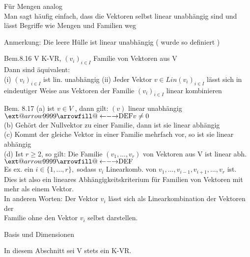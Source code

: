 \documentclass[headsepline,12pt,a4paper]{scrartcl}
\makeatletter
\newcommand\xleftrightarrow[2][]{%
  \ext@arrow 9999{\longleftrightarrowfill@}{#1}{#2}}
\newcommand\longleftrightarrowfill@{%
  \arrowfill@\leftarrow\relbar\rightarrow}
\makeatother
\begin{document}
Für Mengen analog \\

Man sagt häufig einfach, dass die Vektoren selbst linear unabhängig sind und lässt Begriffe wie Mengen und Familien weg \\

\item Anmerkung: Die leere Hülle ist linear unabhängig ( wurde so definiert ) \\

\newpage

\item[Bem.8.16] 
V K-VR, $(v_i)_{i \in I}$ Familie von Vektoren aus V \\
Dann sind äquivalent: \\

(i) $(v_i)_{i \in I}$ ist lin. unabhängig 
(ii) Jeder Vektor $ v \in \textit{Lin}(v_i)_{i \in I}$ lässt sich in eindeutiger Weise aus Vektoren der Familie $(v_i)_{i \in I}$ linear kombinieren

\item[Bem. 8.17]
(a) ist $v \in V$ , dann gilt: $(v)$ linear unabhängig $\xleftrightarrow{\text{DEF}} v \neq 0 $ \\
(b) Gehört der Nullvektor zu einer Familie, dann ist sie linear abhängig \\
(c) Kommt der gleiche Vektor in einer Familie mehrfach vor, so ist sie linear abhängig \\
(d) Ist $r \geq 2$, so gilt: Die Familie $(v_1,...,v_r)$ von Vektoren aus V ist linear abh. $\xleftrightarrow{\text{DEF}}$ \\
Es ex. ein $i\in \{1,...,r\}, $ sodass $v_i$ Linearkomb. von $v_1,..., v_{i-1} , v_{i+1},...,v_r $ ist. \\
Dies ist also ein lineares Abhängigkeitskriterium für Familien von Vektoren mit mehr als einem Vektor. \\

In anderen Worten: Der Vektor $v_i$ lässt sich als Linearkombination der Vektoren der\\ Familie ohne den Vektor $v_i$ selbst darstellen. \\

\newpage

\begin{center}
\item[Basis und Dimensionen]
\end{center}
In diesem Abschnitt sei V stets ein K-VR.  \\
\end{document}
